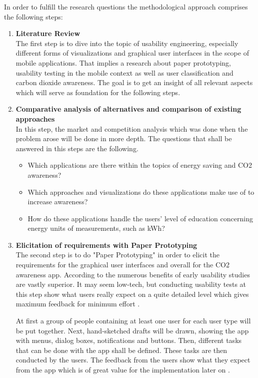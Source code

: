 In order to fulfill the research questions the methodological approach comprises the following steps:
\begin{enumerate}
	\item \textbf{Literature Review} \\
	The first step is to dive into the topic of usability engineering, especially different forms of visualizations and graphical user interfaces in the scope of mobile applications. That implies a research about paper prototyping, usability testing in the mobile context as well as user classification and carbon dioxide awareness. The goal is to get an insight of all relevant aspects which will serve as foundation for the following steps.
	
	\item \textbf{Comparative analysis of alternatives and comparison of existing approaches} \\
	In this step, the market and competition analysis which was done when the problem arose will be done in more depth. The questions that shall be answered in this steps are the following.
	\begin{itemize}
		\item Which applications are there within the topics of energy saving and CO2 awareness?
		\item Which approaches and visualizations do these applications make use of to increase awareness?
		\item How do these applications handle the users' level of education concerning energy units of measurements, such as kWh?
	\end{itemize}
	
	\item \textbf{Elicitation of requirements with Paper Prototyping} \\
	The second step is to do "Paper Prototyping" in order to elicit the requirements for the graphical user interfaces and overall for the CO2 awareness app. According to \cite{lancaster2004paper} the numerous benefits of early usability studies are vastly superior. It may seem low-tech, but conducting usability tests at this step show what users really expect on a quite detailed level which gives maximum feedback for minimum effort \cite{weiss2003handheld}.
	
	At first a group of people containing at least one user for each user type will be put together.  Next, hand-sketched drafts will be drawn, showing the app with menus, dialog boxes, notifications and buttons. Then, different tasks that can be done with the app shall be defined. These tasks are then conducted by the users. The feedback from the users show what they expect from the app which is of great value for the implementation later on \cite{snyder2003paper}.
	

\end{enumerate}
